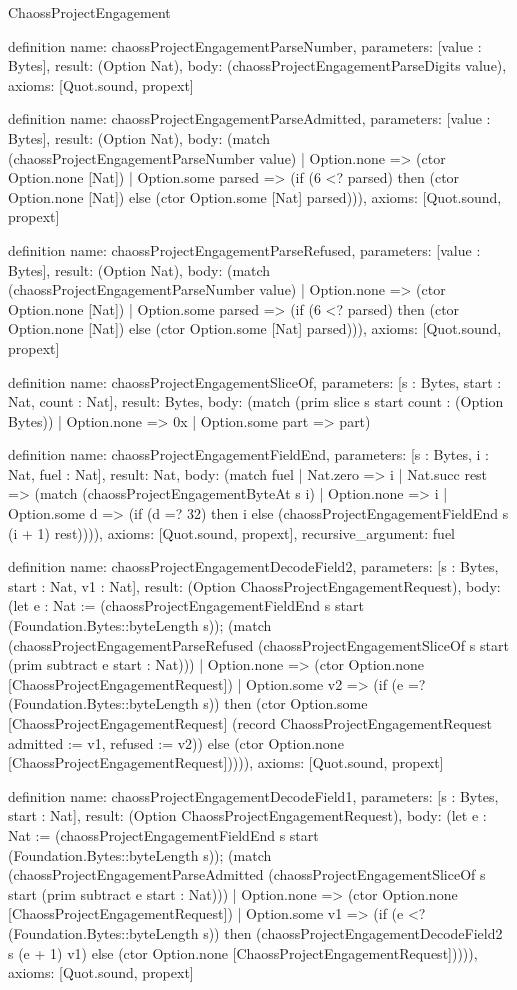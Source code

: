\begin{lexlean}{ChaossProjectEngagement}
\begin{semanticmodule}
definition{
  name: chaossProjectEngagementParseNumber,
  parameters: [value : Bytes],
  result: (Option Nat),
  body: (chaossProjectEngagementParseDigits value),
  axioms: [Quot.sound, propext]
}

definition{
  name: chaossProjectEngagementParseAdmitted,
  parameters: [value : Bytes],
  result: (Option Nat),
  body: (match (chaossProjectEngagementParseNumber value)
    | Option.none => (ctor Option.none [Nat])
    | Option.some parsed => (if (6 <? parsed) then (ctor Option.none [Nat]) else (ctor Option.some [Nat] parsed))),
  axioms: [Quot.sound, propext]
}

definition{
  name: chaossProjectEngagementParseRefused,
  parameters: [value : Bytes],
  result: (Option Nat),
  body: (match (chaossProjectEngagementParseNumber value)
    | Option.none => (ctor Option.none [Nat])
    | Option.some parsed => (if (6 <? parsed) then (ctor Option.none [Nat]) else (ctor Option.some [Nat] parsed))),
  axioms: [Quot.sound, propext]
}

definition{
  name: chaossProjectEngagementSliceOf,
  parameters: [s : Bytes, start : Nat, count : Nat],
  result: Bytes,
  body: (match (prim slice s start count : (Option Bytes))
    | Option.none => 0x
    | Option.some part => part)
}

definition{
  name: chaossProjectEngagementFieldEnd,
  parameters: [s : Bytes, i : Nat, fuel : Nat],
  result: Nat,
  body: (match fuel
    | Nat.zero => i
    | Nat.succ rest => (match (chaossProjectEngagementByteAt s i)
      | Option.none => i
      | Option.some d => (if (d =? 32) then i else (chaossProjectEngagementFieldEnd s (i + 1) rest)))),
  axioms: [Quot.sound, propext],
  recursive_argument: fuel
}

definition{
  name: chaossProjectEngagementDecodeField2,
  parameters: [s : Bytes, start : Nat, v1 : Nat],
  result: (Option ChaossProjectEngagementRequest),
  body: (let e : Nat := (chaossProjectEngagementFieldEnd s start (Foundation.Bytes::byteLength s)); (match (chaossProjectEngagementParseRefused (chaossProjectEngagementSliceOf s start (prim subtract e start : Nat)))
    | Option.none => (ctor Option.none [ChaossProjectEngagementRequest])
    | Option.some v2 => (if (e =? (Foundation.Bytes::byteLength s)) then (ctor Option.some [ChaossProjectEngagementRequest] (record ChaossProjectEngagementRequest {admitted := v1, refused := v2})) else (ctor Option.none [ChaossProjectEngagementRequest])))),
  axioms: [Quot.sound, propext]
}

definition{
  name: chaossProjectEngagementDecodeField1,
  parameters: [s : Bytes, start : Nat],
  result: (Option ChaossProjectEngagementRequest),
  body: (let e : Nat := (chaossProjectEngagementFieldEnd s start (Foundation.Bytes::byteLength s)); (match (chaossProjectEngagementParseAdmitted (chaossProjectEngagementSliceOf s start (prim subtract e start : Nat)))
    | Option.none => (ctor Option.none [ChaossProjectEngagementRequest])
    | Option.some v1 => (if (e <? (Foundation.Bytes::byteLength s)) then (chaossProjectEngagementDecodeField2 s (e + 1) v1) else (ctor Option.none [ChaossProjectEngagementRequest])))),
  axioms: [Quot.sound, propext]
}


\end{semanticmodule}
\end{lexlean}
